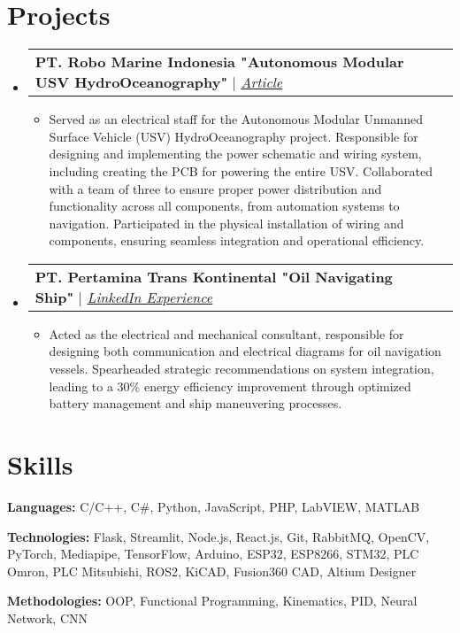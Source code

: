 \documentclass[letterpaper,11pt]{article}
\makeatletter
\newcommand{\resumeItem}[1]{
  \item\small{
    {#1 \vspace{-2pt}}
  }
}
\newcommand{\resumeProjectHeading}[2]{
    \vspace{-2pt}\item
    \begin{tabular*}{0.97\textwidth}{l@{\extracolsep{\fill}}r}
      \small#1 & #2 \\
    \end{tabular*}\vspace{-7pt}
}
\newcommand{\resumeSubHeadingListStart}{\begin{itemize}[leftmargin=0.15in, label={}]}
\newcommand{\resumeSubHeadingListEnd}{\end{itemize}}
\newcommand{\resumeItemListStart}{\begin{itemize}}
\newcommand{\resumeItemListEnd}{\end{itemize}\vspace{-5pt}}
\makeatother
\begin{document}
\section{Projects}
    \vspace{3pt}
    \resumeSubHeadingListStart            
      \resumeProjectHeading
            {\textbf{PT. Robo Marine Indonesia "Autonomous Modular USV HydroOceanography"} $|$ \emph{\href{https://www.linkedin.com/feed/update/urn:li:activity:7245271363135922177/}{\color{blue}Article}}}{}
          \resumeItemListStart
            \resumeItem{Served as an electrical staff for the Autonomous Modular Unmanned Surface Vehicle (USV) HydroOceanography project. Responsible for designing and implementing the power schematic and wiring system, including creating the PCB for powering the entire USV. Collaborated with a team of three to ensure proper power distribution and functionality across all components, from automation systems to navigation. Participated in the physical installation of wiring and components, ensuring seamless integration and operational efficiency.}
          \resumeItemListEnd

     \resumeProjectHeading
        {\textbf{PT. Pertamina Trans Kontinental "Oil Navigating Ship"} $|$ \emph{\href{https://www.linkedin.com/in/jonathan-oktaviano/details/projects/}{\color{blue}LinkedIn Experience}}}{}
          \resumeItemListStart
            \resumeItem{Acted as the electrical and mechanical consultant, responsible for designing both communication and electrical diagrams for oil navigation vessels. Spearheaded strategic recommendations on system integration, leading to a 30\% energy efficiency improvement through optimized battery management and ship maneuvering processes.}
          \resumeItemListEnd
          
    \resumeSubHeadingListEnd

    

\section{Skills}
  \vspace{2pt}
  \resumeSubHeadingListStart
    \small{\item{
        
        \textbf{Languages:}{ C/C++, C\#, Python, JavaScript, PHP, LabVIEW, MATLAB} \\ \vspace{3pt}
        
        \textbf{Technologies:}{ Flask, Streamlit, Node.js, React.js, Git, RabbitMQ, OpenCV, PyTorch, Mediapipe, TensorFlow, Arduino, ESP32, ESP8266, STM32, PLC Omron, PLC Mitsubishi, ROS2, KiCAD, Fusion360 CAD, Altium Designer} \\ \vspace{3pt}
        
        \textbf{Methodologies:} {OOP, Functional Programming, Kinematics, PID, Neural Network, CNN} \\ \vspace{3pt}
        
    }}
  \resumeSubHeadingListEnd
\end{document}
